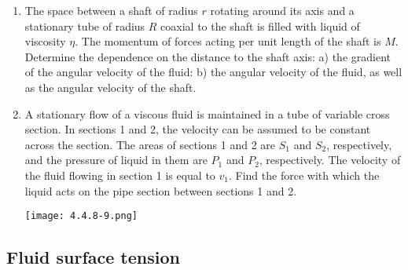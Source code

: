 \documentclass{article}
\begin{document}
\begin{enumerate}[label=4.4.\arabic*]
\item The space between a shaft of radius $r$ rotating around its axis and a stationary tube of radius $R$ coaxial to the shaft is filled with liquid of viscosity $\eta$. The momentum of forces acting per unit length of the shaft is $M$. Determine the dependence on the distance to the shaft axis: a) the gradient of the angular velocity of the fluid: b) the angular velocity of the fluid, as well as the angular velocity of the shaft. 


\item A stationary flow of a viscous fluid is maintained in a tube of variable cross section. In sections 1 and 2, the velocity can be assumed to be constant across the section. The areas of sections 1 and 2 are $S_1$ and $S_2$, respectively, and the pressure of liquid in them are $P_1$ and $P_2$, respectively. The velocity of the fluid flowing in section 1 is equal to $v_1$. Find the force with which the liquid acts on the pipe section between sections 1 and 2.

\begin{center}
    \texttt{[image: 4.4.8-9.png]}
\end{center}


\end{enumerate}

\subsection{Fluid surface tension}
\end{document}
